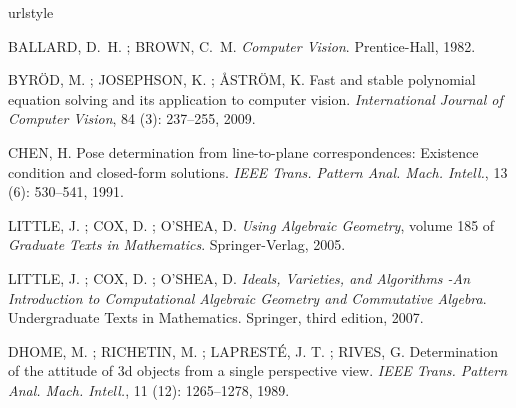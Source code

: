 \documentclass[a4paper,12pt,oneside,onecolumn,final,fleqn]{repUERJ}
\begin{document}







\backmatter
%
%
%
\begin{thebibliography}{33}
\providecommand{\natexlab}[1]{#1}
\providecommand{\url}[1]{\texttt{#1}}
\expandafter\ifx\csname urlstyle\endcsname\relax
  \providecommand{\doi}[1]{doi: #1}\else
  \providecommand{\doi}{doi: \begingroup \urlstyle{rm}\Url}\fi
  
BALLARD, D.~H. ; BROWN, C.~M.
\newblock \emph{Computer Vision}.
\newblock Prentice-Hall, 1982.

BYR\"OD, M. ; JOSEPHSON, K. ; ÅSTR\"OM, K.
\newblock Fast and stable polynomial equation solving and its application to
  computer vision.
\newblock \emph{International Journal of Computer Vision}, 84
  (3): 237--255, 2009.

CHEN, H.
\newblock Pose determination from line-to-plane correspondences: Existence
  condition and closed-form solutions.
\newblock \emph{IEEE Trans. Pattern Anal. Mach. Intell.}, 13
  (6): 530--541, 1991.

LITTLE, J. ; COX, D. ; O'SHEA, D.
\newblock \emph{Using Algebraic Geometry}, volume 185 of \emph{Graduate Texts
  in Mathematics}.
\newblock Springer-Verlag, 2005.

LITTLE, J. ; COX, D. ; O'SHEA, D.
\newblock \emph{Ideals, Varieties, and Algorithms -An Introduction to
  Computational Algebraic Geometry and Commutative Algebra}.
\newblock Undergraduate Texts in Mathematics. Springer, third edition, 2007.

DHOME, M. ; RICHETIN, M. ; LAPRESTÉ, J. T. ; RIVES, G.
\newblock Determination of the attitude of 3d objects from a single perspective
  view.
\newblock \emph{IEEE Trans. Pattern Anal. Mach. Intell.}, 11
  (12): 1265--1278, 1989.


\end{thebibliography}
\end{document}
